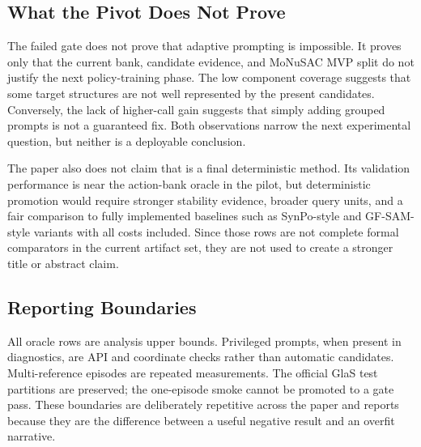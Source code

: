 \subsection{What the Pivot Does Not Prove}
The failed gate does not prove that adaptive prompting is impossible. It proves only that the current bank, candidate evidence, and MoNuSAC MVP split do not justify the next policy-training phase. The low component coverage suggests that some target structures are not well represented by the present candidates. Conversely, the lack of higher-call gain suggests that simply adding grouped prompts is not a guaranteed fix. Both observations narrow the next experimental question, but neither is a deployable conclusion.

The paper also does not claim that \OracleAnalysisBestFixed{} is a final deterministic method. Its validation performance is near the action-bank oracle in the pilot, but deterministic promotion would require stronger stability evidence, broader query units, and a fair comparison to fully implemented baselines such as SynPo-style and GF-SAM-style variants with all costs included. Since those rows are not complete formal comparators in the current artifact set, they are not used to create a stronger title or abstract claim.

\subsection{Reporting Boundaries}
All oracle rows are analysis upper bounds. Privileged prompts, when present in diagnostics, are API and coordinate checks rather than automatic candidates. Multi-reference episodes are repeated measurements. The official GlaS test partitions are preserved; the one-episode smoke cannot be promoted to a gate pass. These boundaries are deliberately repetitive across the paper and reports because they are the difference between a useful negative result and an overfit narrative.
